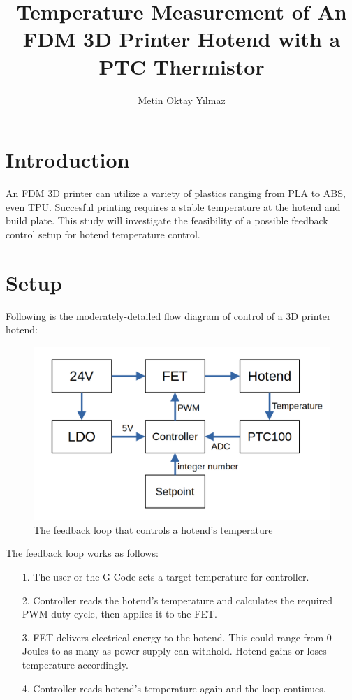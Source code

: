 \documentclass[12pt,a4paper]{report}
\title{Temperature Measurement of An FDM 3D Printer Hotend with a PTC
Thermistor}
\author{Metin Oktay Yılmaz}
\begin{document}
    \maketitle
    
    \section*{Introduction}
    An FDM 3D printer can utilize a variety of plastics ranging from PLA to
    ABS, even TPU. Succesful printing requires a stable temperature at the
    hotend and build plate. This study will investigate the feasibility of a
    possible feedback control setup for hotend temperature control.

    \section*{Setup}
    Following is the moderately-detailed flow diagram of control of a 3D
    printer hotend:
    \begin{figure}[H]
        \centering
        \includegraphics[scale=0.2]{diagram.png}
        \caption{The feedback loop that controls a hotend's temperature}
    \end{figure}

    The feedback loop works as follows:
    \begin{itemize}
        \item[1.] The user or the G-Code sets a target temperature for
        controller.
        \item[2.] Controller reads the hotend's temperature and calculates the
        required PWM duty cycle, then applies it to the FET.
        \item[3.] FET delivers electrical energy to the hotend. This could
        range from 0 Joules to as many as power supply can withhold. Hotend
        gains or loses temperature accordingly.
        \item[4.] Controller reads hotend's temperature again and the loop
        continues.
    \end{itemize}
\end{document}
